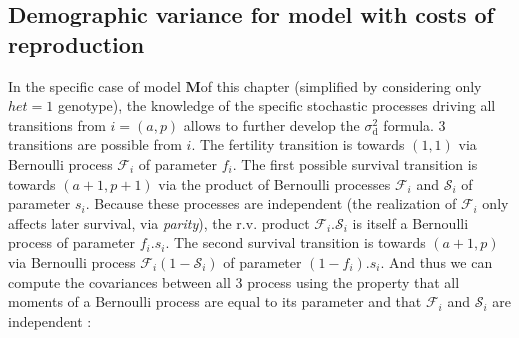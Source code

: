 \documentclass[10pt,a4paper]{article}
\newcommand{\M}{$\mathbf{M}$}
\begin{document}
\subsection{Demographic variance for model with costs of reproduction}
\label{sec:app_dem_var}


In the specific case of model \M of this chapter (simplified by considering only $het=1$ genotype), the knowledge of the specific stochastic processes driving all transitions from $i=(a,p)$ allows to further develop the $\sigma_\mathrm{d}^2$ formula.
3 transitions are possible from $i$. The fertility transition is towards $(1,1)$ via Bernoulli process $\mathcal{F}_{i}$ of parameter $f_{i}$. The first possible survival transition is towards $(a+1,p+1)$ via the product of Bernoulli processes $\mathcal{F}_{i}$ and $\mathcal{S}_{i}$ of parameter $s_{i}$. Because these processes are independent (the realization of $\mathcal{F}_{i}$ only affects later survival, via \emph{parity}), the r.v. product $\mathcal{F}_{i}.\mathcal{S}_{i}$ is itself a Bernoulli process of parameter $f_{i}.s_{i}$. The second survival transition is towards $(a+1,p)$ via Bernoulli process $\mathcal{F}_{i}(1-\mathcal{S}_{i})$ of parameter $(1-f_{i}).s_{i} $. And thus we can compute the covariances between all 3 process using the property that all moments of a Bernoulli process are equal to its parameter and that $\mathcal{F}_{i}$ and $\mathcal{S}_{i}$ are independent : 
\end{document}
